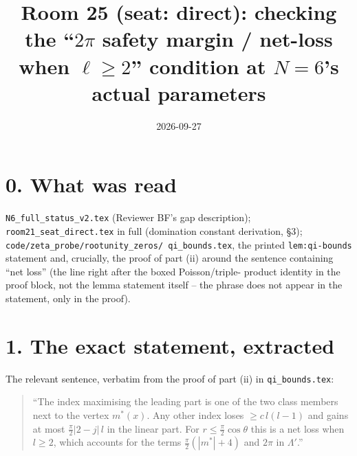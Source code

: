 \documentclass[11pt]{article}
\title{Room 25 (seat: direct): checking the ``$2\pi$ safety margin / net-loss when
$\ell\ge2$'' condition at $N=6$'s actual parameters}
\date{2026-09-27}
\begin{document}
\maketitle

\section*{0. What was read}

\texttt{N6\_full\_status\_v2.tex} (Reviewer BF's gap description); \texttt{room21\_seat\_direct.tex}
in full (domination constant derivation, \S3); \texttt{code/zeta\_probe/rootunity\_zeros/
qi\_bounds.tex}, the printed \texttt{lem:qi-bounds} statement and, crucially, the proof of part
(ii) around the sentence containing ``net loss'' (the line right after the boxed Poisson/triple-
product identity in the proof block, not the lemma statement itself -- the phrase does not appear
in the statement, only in the proof).

\section*{1. The exact statement, extracted}

The relevant sentence, verbatim from the proof of part (ii) in \texttt{qi\_bounds.tex}:

\begin{quote}
``The index maximising the leading part is one of the two class members next to the vertex
$m^*(x)$. Any other index loses $\ge c\,l(l-1)$ and gains at most $\frac\pi2|2-j|\,l$ in the
linear part. For $r\le\frac\pi2\cos\theta$ this is a net loss when $l\ge2$, which accounts for the
terms $\frac\pi2(|m^*|+4)$ and $2\pi$ in $\Lambda'$.''
\end{quote}
\end{document}
